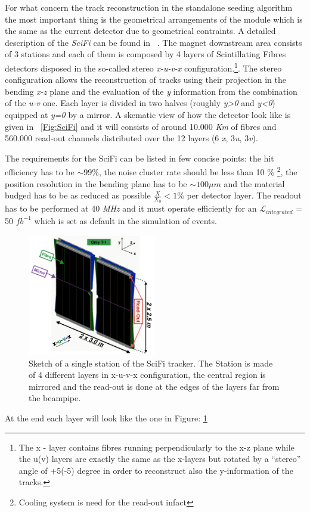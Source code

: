 \documentclass[paper=a4, fontsize=10pt]{scrartcl}
\numberwithin{equation}{section}		%
\numberwithin{figure}{section}			%
\numberwithin{table}{section}				%
\begin{document}
For what concern the track reconstruction in the standalone seeding algorithm the most important thing is the geometrical arrangements of the module which is the same as the current detector due to geometrical contraints. A detailed description of the \textit{SciFi} can be found in ~\cite{TDR_SciFi}. The magnet downstream area consists of 3 stations and each of them is composed by 4 layers of Scintillating Fibres detectors disposed in the so-called stereo \textit{x-u-v-x} configuration.\footnote{The x - layer contains fibres running perpendicularly to the x-z plane while the u(v) layers are exactly the same as the x-layers but rotated by a ``stereo'' angle of +5(-5) degree in order to reconstruct also the y-information of the tracks.}. The stereo configuration allows the reconstruction of tracks using their projection in the bending \textit{x-z} plane and the evaluation of the \textit{y} information from the combination of the \textit{u-v} one. Each layer is divided in two halves (roughly \textit{y>0} and \textit{y<0}) equipped at \textit{y=0} by a mirror.
A skematic view of how the detector look like is given in ~\ref{Fig:SciFi} and it will consists of around 10.000 \textit{Km} of fibres and 560.000 read-out channels distributed over the 12 layers (6 \textit{x}, 3\textit{u}, 3\textit{v}).

The requirements for the SciFi can be listed in few concise points: the hit efficiency has to be $\sim 99 \%$, the noise cluster rate should be less than 10 $\%$ \footnote{Cooling system is need for the read-out infact}, the position resolution in the bending plane has to be $\sim 100 \mu m$ and the material budged has to be as reduced as possible $\frac{X}{X_{0}}<1 \%$ per detector layer. The readout has to be performed at 40 \textit{MHz} and it must operate efficiently for an $\mathcal{L}_{integrated}$ = 50 $fb^{-1}$ which is set as default in the simulation of events.
\begin{figure}[h]
  \begin{center}
    \includegraphics[width=0.5\textwidth]{Images/ModuleSciFi.png} 
  \caption[Caption for track type]{Sketch of a single station of the SciFi tracker. The Station is made of 4 different layers in x-u-v-x configuration, the central region is mirrored and the read-out is done at the edges of the layers far from the beampipe.}
  \label{Module}
  \end{center}
\end{figure}
At the end each layer will look like the one in Figure: \ref{Module}
\end{document}
